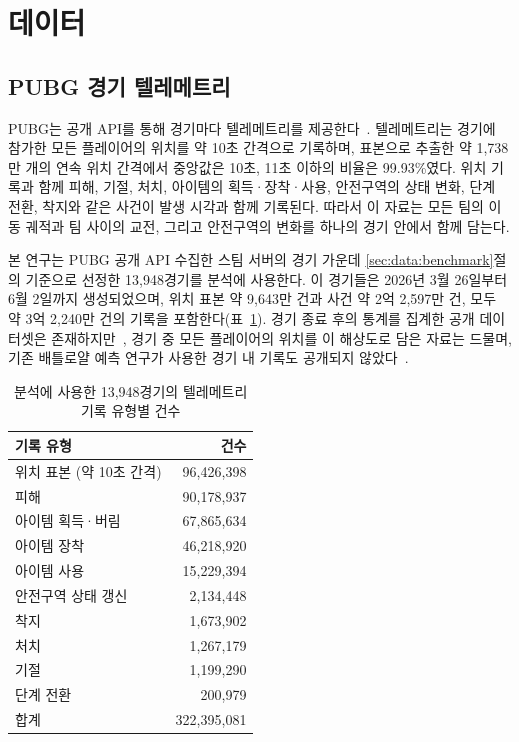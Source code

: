 \section{데이터}
\label{sec:data}

\subsection{PUBG 경기 텔레메트리}
\label{sec:data:telemetry}

PUBG는 공개 API를 통해 경기마다 텔레메트리를 제공한다~\cite{PUBGAPI}.
텔레메트리는 경기에 참가한 모든 플레이어의 위치를 약 10초 간격으로 기록하며, 표본으로 추출한 약 1,738만 개의 연속 위치 간격에서 중앙값은 10초, 11초 이하의 비율은 99.93\%였다.
위치 기록과 함께 피해, 기절, 처치, 아이템의 획득·장착·사용, 안전구역의 상태 변화, 단계 전환, 착지와 같은 사건이 발생 시각과 함께 기록된다.
따라서 이 자료는 모든 팀의 이동 궤적과 팀 사이의 교전, 그리고 안전구역의 변화를 하나의 경기 안에서 함께 담는다.

본 연구는 PUBG 공개 API 수집한 스팀 서버의 경기 가운데 \ref{sec:data:benchmark}절의 기준으로 선정한 13,948경기를 분석에 사용한다.
이 경기들은 2026년 3월 26일부터 6월 2일까지 생성되었으며, 위치 표본 약 9,643만 건과 사건 약 2억 2,597만 건, 모두 약 3억 2,240만 건의 기록을 포함한다(표~\ref{tab:corpus}).
경기 종료 후의 통계를 집계한 공개 데이터셋은 존재하지만~\cite{KagglePUBG}, 경기 중 모든 플레이어의 위치를 이 해상도로 담은 자료는 드물며, 기존 배틀로얄 예측 연구가 사용한 경기 내 기록도 공개되지 않았다~\cite{Sagong25a,KRAFTON}.

\begin{table}[t]
\centering
\caption{분석에 사용한 13,948경기의 텔레메트리 기록 유형별 건수}
\label{tab:corpus}
\begin{tabular}{lr}
\hline
기록 유형 & 건수 \\
\hline
위치 표본 (약 10초 간격) & 96,426,398 \\
피해 & 90,178,937 \\
아이템 획득·버림 & 67,865,634 \\
아이템 장착 & 46,218,920 \\
아이템 사용 & 15,229,394 \\
안전구역 상태 갱신 & 2,134,448 \\
착지 & 1,673,902 \\
처치 & 1,267,179 \\
기절 & 1,199,290 \\
단계 전환 & 200,979 \\
\hline
합계 & 322,395,081 \\
\hline
\end{tabular}
\end{table}

